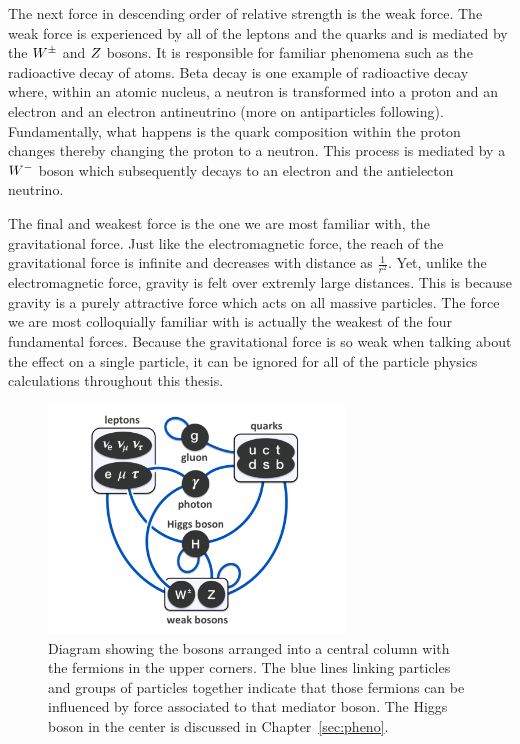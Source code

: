 The next force in descending order of relative strength is the weak force.
The weak force is experienced by
all of the leptons and the quarks and is mediated by the $W^{\pm}$ and $Z$ 
bosons. It is responsible for familiar phenomena such as the radioactive decay of atoms. 
Beta decay is one example of radioactive decay where, within an atomic nucleus,
a neutron is transformed into a proton and an electron and an electron antineutrino
(more on antiparticles following). Fundamentally, what happens
is the quark composition within the proton changes thereby changing the proton to a
neutron. This process is mediated by a $W^{-}$ boson which subsequently decays
to an electron and the antielecton neutrino.

The final and weakest force is the one we are most familiar with, the gravitational
force. Just like the electromagnetic force, the reach of the gravitational force 
is infinite and decreases with distance as $\frac{1}{r^{2}}$. Yet, unlike the
electromagnetic force, gravity is felt over extremly large distances. This is because
gravity is a purely attractive force which acts on all massive particles.
The force we are most colloquially familiar with is actually the
weakest of the four fundamental forces. Because the gravitational force is so weak
when talking about the effect on a single particle, it can be ignored for
all of the particle physics calculations throughout this thesis.

\begin{figure}[htbp]
\centering
     \includegraphics[width=0.7\textwidth]{introduction/plots/elementary_particle_interactions_SM.pdf}
     \caption{
Diagram showing the bosons arranged into a central column with the fermions in the
upper corners. The blue lines linking particles and groups of particles together
indicate that those fermions can be influenced by force associated to that mediator
boson. The Higgs boson in the center is discussed in Chapter~\ref{sec:pheno}.
     }
     \label{fig:sm_forces}
\end{figure}

